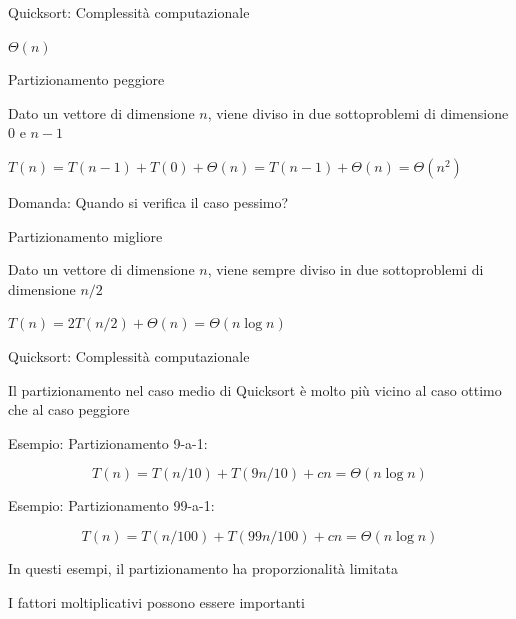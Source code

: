 \begin{frame}{Quicksort: Complessità computazionale}

\BI
\item $\Theta(n)$
\EI

\BIL
\item \alert{Partizionamento peggiore}
\BI
\item Dato un vettore di dimensione $n$, viene diviso in due sottoproblemi di 
dimensione $0$ e $n-1$
\item $T(n) = T(n-1)+T(0)+\Theta(n) = T(n-1) + \Theta(n) = \Theta(n^2)$
\item Domanda: Quando si verifica il caso pessimo?
\EI
\item \alert{Partizionamento migliore}
\BI
\item Dato un vettore di dimensione $n$, viene sempre diviso in due 
sottoproblemi di dimensione $n/2$
\item $T(n) = 2T(n/2)+\Theta(n) = \Theta(n \log n)$
\EI
\EIL

\end{frame}

\begin{frame}{Quicksort: Complessità computazionale}

\BIL
\item Il partizionamento nel caso medio di Quicksort è molto più vicino al caso ottimo che al caso peggiore
\item Esempio: Partizionamento 9-a-1:	

\vspace{-6pt}
\[T(n) = T(n/10)+T(9n/10)+cn = \Theta(n \log n)\]
\item Esempio: Partizionamento 99-a-1:	

\vspace{-6pt}
\[T(n) = T(n/100)+T(99n/100)+cn  = \Theta(n \log n)\]
\EIL
{}
\BIL
\item In questi esempi, il partizionamento ha proporzionalità limitata
\item I fattori moltiplicativi possono essere importanti
\EIL
\end{frame}


